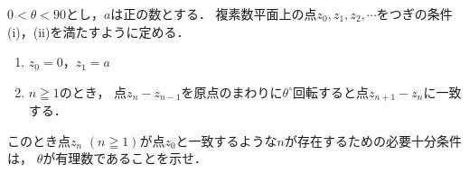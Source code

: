 \documentclass[../../main.tex]{subfiles}
\begin{document}
$0<\theta<90$とし，$a$は正の数とする．
複素数平面上の点$z_0,z_1,z_2,\cdots$をつぎの条件(i)，(ii)を満たすように定める．
\begin{enumerate}
  \item[(i)] $z_0=0$，$z_1=a$
  \item[(ii)] $n \geqq 1$のとき，
    点$z_n-z_{n-1}$を原点のまわりに$\theta^\circ$回転すると点$z_{n+1}-z_n$に一致する．
\end{enumerate}
このとき点$z_n$ $(n \geqq 1)$が点$z_0$と一致するような$n$が存在するための必要十分条件は，
$\theta$が有理数であることを示せ．
\end{document}
